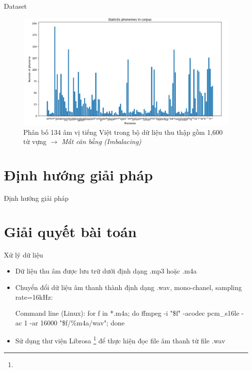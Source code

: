 \documentclass[10pt,a4paper,openany]{beamer}
\begin{document}
	\begin{frame}{Dataset}
		\begin{figure}[htbp]
			\centerline{\includegraphics[scale=0.25]{charts/distribution_phonemes.png}}
			\caption{Phân bố 134 âm vị tiếng Việt trong bộ dữ liệu thu thập gồm 1,600 từ vựng \emph{\color{red}$\rightarrow$ Mất cân bằng (Imbalacing)}}
			\label{fig_distribution_phonemes}
		\end{figure}
	\end{frame}
	
	\section{Định hướng giải pháp}
	\begin{frame}{Định hướng giải pháp}
		\begin{center}
		\end{center}
	\end{frame}
	
	\section{Giải quyết bài toán}
	\begin{frame}{Xử lý dữ liệu}
		\begin{itemize}
			\item Dữ liệu thu âm được lưu trữ dưới định dạng .mp3 hoặc .m4a \pause
			\item Chuyển đổi dữ liệu âm thanh thành định dạng .wav, mono-chanel, sampling rate=16kHz: \pause
			\begin{block}{Command line (Linux):}
				for f in *.m4a; do ffmpeg -i "\$f" -acodec pcm\_s16le -ac 1 -ar 16000 "\${f/\%m4a/wav}"; done \pause
			\end{block}
			\item Sử dụng thư viện Librosa \footnote{} để thực hiện đọc file âm thanh từ file .wav
		\end{itemize}
	\end{frame}
	
\end{document}
